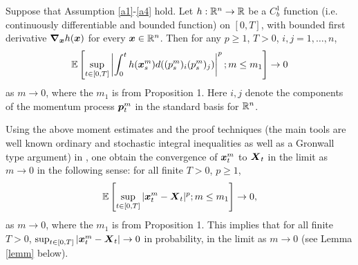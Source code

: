 \begin{proposition} 
Suppose that Assumption \ref{a1}-\ref{a4} hold.
Let $h :\mathbb{R}^{n} \to \mathbb{R}$ be a $C_{b}^{1}$ function (i.e. continuously differentiable and bounded function) on $[0,T]$, with bounded first derivative $\boldsymbol{\nabla}_{\boldsymbol{x}} h(\boldsymbol{x})$ for every $\boldsymbol{x} \in \mathbb{R}^n$. Then for any $p \geq 1$, $T>0$, $i,j = 1, \dots, n$,
\begin{equation} \mathbb{E} \left[ \sup_{t \in [0,T]} \left| \int_{0}^{t} h(\boldsymbol{x}^m_{s}) d((p^m_{s})_{i} (p^m_{s})_{j}) \right|^p; m \leq m_1\right]  \to 0 \end{equation}  as $m \to 0$, where the $m_1$ is from Proposition 1. Here $i,j$ denote the components of the momentum process $\boldsymbol{p}^m_{t}$ in the standard basis for $\mathbb{R}^{n}$. 
\end{proposition}





Using the above moment estimates and the proof techniques (the main tools are well known ordinary and stochastic integral inequalities as well as a Gronwall type argument) in \cite{birrell2017small, birrell2017homogenization}, one  obtain the convergence of $\boldsymbol{x}^m_{t}$ to $\boldsymbol{X}_{t}$ in the limit as $m \to 0$ in the following sense:   for all finite $T>0$, $p \geq 1$, 
\begin{equation} \label{nonst}
\mathbb{E}\left[ \sup_{t \in [0,T]} |\boldsymbol{x}_t^m - \boldsymbol{X}_t|^p; m \leq m_1\right] \to 0,
\end{equation}
as $m \to 0$, where the $m_1$ is from Proposition 1. This implies that for all finite $T>0$,  $\sup_{t \in [0,T]} |\boldsymbol{x}_t^m - \boldsymbol{X}_t| \to 0$ in probability, in the limit as $m \to 0$ (see Lemma \ref{lemm} below).

